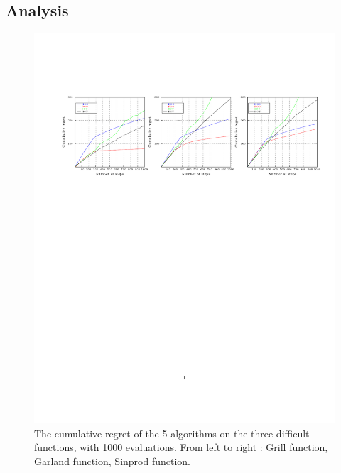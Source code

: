 \documentclass[a4paper,10pt]{article}
\begin{document}
\subsection{Analysis}
\begin{figure}[!ht]
\label{fig:cumulative1000}
\hspace{-5cm}\includegraphics[trim={0 6cm 0 4cm},clip]{cumulative1000.pdf}
\vspace{-12cm}
  \caption{The cumulative regret of the 5 algorithms on the three difficult functions, with 1000 evaluations. From left to right : Grill function, Garland function, Sinprod function. }
\end{figure}
\end{document}
